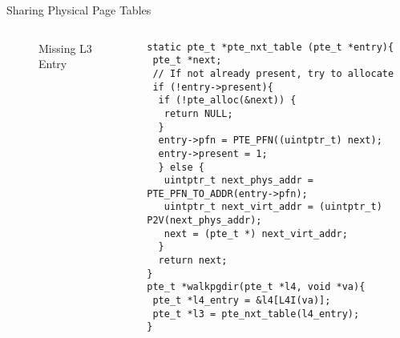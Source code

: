 \documentclass[aspectratio=169,xcolor=dvipsnames]{beamer}
\begin{document}
\begin{frame}[fragile]{Sharing Physical Page Tables}
\begin{columns}[c]
\begin{figure}
\begin{tikzpicture}[x=0.75pt,y=0.75pt,yscale=-0.5,xscale=0.5]
\end{tikzpicture}
        \caption{Missing L3 Entry}
        \label{fig:enter-label}
    \end{figure}
\begin{lstlisting}[style=CStyleNum, basicstyle=\tiny]
static pte_t *pte_nxt_table (pte_t *entry){
 pte_t *next;
 // If not already present, try to allocate
 if (!entry->present){
  if (!pte_alloc(&next)) {
   return NULL;
  }
  entry->pfn = PTE_PFN((uintptr_t) next);
  entry->present = 1;
  } else {
   uintptr_t next_phys_addr = PTE_PFN_TO_ADDR(entry->pfn);        
   uintptr_t next_virt_addr = (uintptr_t) P2V(next_phys_addr);
   next = (pte_t *) next_virt_addr;
  }
  return next;
}   
pte_t *walkpgdir(pte_t *l4, void *va){ 
 pte_t *l4_entry = &l4[L4I(va)];
 pte_t *l3 = pte_nxt_table(l4_entry);
}

\end{lstlisting}
\end{columns}
\end{frame}
\end{document}
